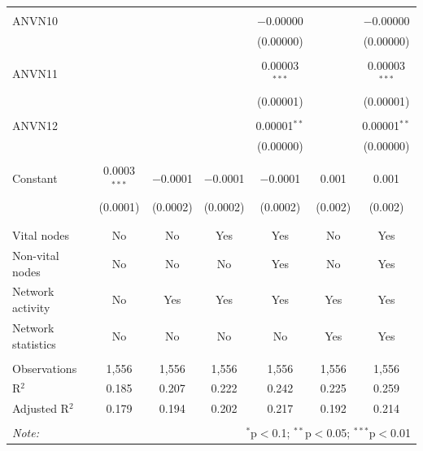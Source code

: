 \begin{table}[!htbp]
\begin{tabular}{@{\extracolsep{5pt}}lcccccc}
  & & & & & & \\ 
 ANVN10 &  &  &  & $-$0.00000 &  & $-$0.00000 \\ 
  &  &  &  & (0.00000) &  & (0.00000) \\ 
  & & & & & & \\ 
 ANVN11 &  &  &  & 0.00003$^{***}$ &  & 0.00003$^{***}$ \\ 
  &  &  &  & (0.00001) &  & (0.00001) \\ 
  & & & & & & \\ 
 ANVN12 &  &  &  & 0.00001$^{**}$ &  & 0.00001$^{**}$ \\ 
  &  &  &  & (0.00000) &  & (0.00000) \\ 
  & & & & & & \\ 
 Constant & 0.0003$^{***}$ & $-$0.0001 & $-$0.0001 & $-$0.0001 & 0.001 & 0.001 \\ 
  & (0.0001) & (0.0002) & (0.0002) & (0.0002) & (0.002) & (0.002) \\ 
  & & & & & & \\ 
\hline \\[-1.8ex] 
Vital nodes & No & No & Yes & Yes & No & Yes \\ 
Non-vital nodes & No & No & No & Yes & No & Yes \\ 
Network activity & No & Yes & Yes & Yes & Yes & Yes \\ 
Network statistics & No & No & No & No & Yes & Yes \\ 
\hline &  &  &  &  &  &  \\ 
Observations & 1,556 & 1,556 & 1,556 & 1,556 & 1,556 & 1,556 \\ 
R$^{2}$ & 0.185 & 0.207 & 0.222 & 0.242 & 0.225 & 0.259 \\ 
Adjusted R$^{2}$ & 0.179 & 0.194 & 0.202 & 0.217 & 0.192 & 0.214 \\ 
\hline 
\hline \\[-1.8ex] 
\textit{Note:}  & \multicolumn{6}{r}{$^{*}$p$<$0.1; $^{**}$p$<$0.05; $^{***}$p$<$0.01} \\ 
\end{tabular} 
\end{table} 
